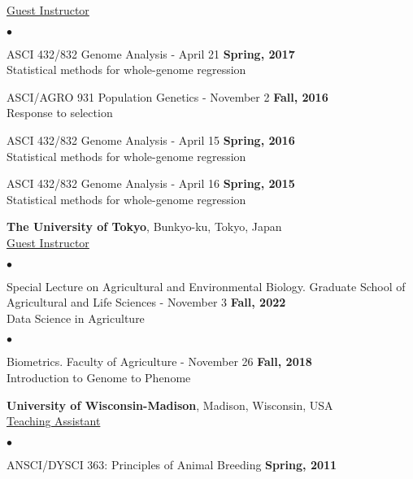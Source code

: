 \documentclass[margin,line,10pt]{res}
\newenvironment{list2}{
  \begin{list}{$\bullet$}{%
      \setlength{\itemsep}{0in}
      \setlength{\parsep}{0in} \setlength{\parskip}{0in}
      \setlength{\topsep}{0in} \setlength{\partopsep}{0in} 
      \setlength{\leftmargin}{0.2in}}}{\end{list}}
\begin{document}
\begin{resume}
 \vspace{.01pt}

\underline{Guest Instructor}
 \vspace{0.4cm}
 \begin{list2}
 \item ASCI 432/832 Genome Analysis - April 21  \hfill {\bf Spring, 2017} \\
   Statistical methods for whole-genome regression
\vspace{0.5cm}
\item ASCI/AGRO 931  Population Genetics - November 2  \hfill {\bf Fall, 2016} \\
  Response to selection
\vspace{0.5cm}
\item ASCI 432/832 Genome Analysis - April 15  \hfill {\bf Spring, 2016} \\
  Statistical methods for whole-genome regression
\vspace{0.5cm}
\item ASCI 432/832 Genome Analysis - April 16    \hfill {\bf Spring, 2015} \\
  Statistical methods for whole-genome regression
\end{list2}


  \vspace{1cm}

{\bf The University of Tokyo}, Bunkyo-ku, Tokyo, Japan \vspace{0.2cm} \\
\underline{Guest Instructor}


\vspace{0.4cm}
 \begin{list2}
 \item Special Lecture on Agricultural and Environmental Biology. Graduate School of Agricultural and Life Sciences - November 3  \hfill {\bf Fall, 2022} \\
   Data Science in Agriculture
\end{list2}


\vspace{0.4cm}
 \begin{list2}
 \item Biometrics. Faculty of Agriculture - November 26 \hfill {\bf Fall, 2018} \\
 Introduction to Genome to Phenome
 \end{list2}


 \vspace{1cm}
 
{\bf University of Wisconsin-Madison}, Madison, Wisconsin, USA  \vspace{0.2cm}  \\
\underline{Teaching Assistant} 
 \vspace{0.4cm}
\begin{list2}
\item ANSCI/DYSCI 363: Principles of Animal Breeding    \hfill {\bf Spring, 2011}


\end{list2}
\end{resume}
\end{document}
